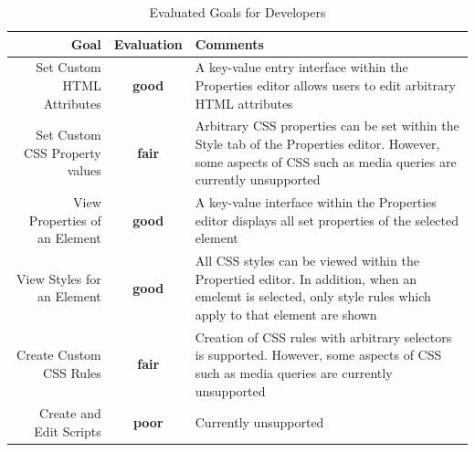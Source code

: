 \documentclass[conference, letterpaper]{IEEEtran}
\begin{document}
\begin{table}[!t]
  \renewcommand{\arraystretch}{1.3}
  \caption{Evaluated Goals for Developers}
  \label{table:developer_goals}
  \centering
  \begin{tabular}{|r|c|p{8cm}|}
    \hline
    Goal & Evaluation & Comments \\
    \hline \hline
    Set Custom HTML Attributes & \textbf{\color{ForestGreen}good} & A key-value entry interface within the Properties editor allows users to edit arbitrary HTML attributes \\
    \hline
    Set Custom CSS Property values & \textbf{\color{Dandelion}fair} & Arbitrary CSS properties can be set within the Style tab of the Properties editor. However, some aspects of CSS such as media queries are currently unsupported \\
    \hline
    View Properties of an Element & \textbf{\color{ForestGreen}good} & A key-value interface within the Properties editor displays all set properties of the selected element \\
    \hline
    View Styles for an Element & \textbf{\color{ForestGreen}good} & All CSS styles can be viewed within the Propertied editor. In addition, when an emelemt is selected, only style rules which apply to that element are shown \\
    \hline
    Create Custom CSS Rules & \textbf{\color{Dandelion}fair} & Creation of CSS rules with arbitrary selectors is supported. However, some aspects of CSS such as media queries are currently unsupported \\
    \hline
    Create and Edit Scripts & \textbf{\color{Red}poor} & Currently unsupported \\
    \hline
  \end{tabular}
\end{table}
\end{document}
